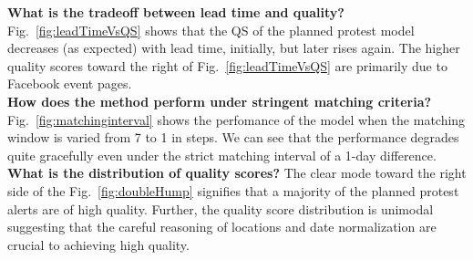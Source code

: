 \noindent
{\bf What is the tradeoff between lead time and quality?}
Fig.~\ref{fig:leadTimeVsQS} shows that the QS of the planned protest model decreases (as expected) with lead time, initially, but
later rises again. The higher quality scores toward the right of Fig.~\ref{fig:leadTimeVsQS} are primarily due to
Facebook event pages.\\

\noindent
{\bf How does the method perform under stringent matching criteria?}
Fig.~\ref{fig:matchinginterval} shows the perfomance of the model when the matching window is varied from 7 to 1 in steps. 
We can see that the performance degrades quite gracefully even under the strict matching interval of a 1-day difference.\\

\noindent
{\bf What is the distribution of quality scores?}
The clear mode toward the right side of the Fig.~\ref{fig:doubleHump} signifies that a majority of the planned 
protest alerts are of high quality. Further, the quality score distribution is unimodal suggesting that the careful reasoning of locations and date normalization are crucial to achieving high quality.


